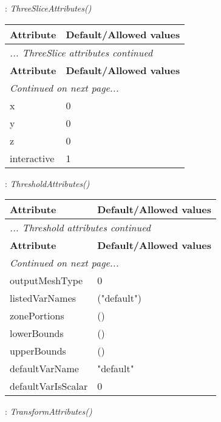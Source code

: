 \documentclass[10pt,a4paper]{report}
\begin{document}
\newpage

{}
: {\it ThreeSliceAttributes() }\\[-3mm]

\begin{longtable}{ll}
{\bf Attribute} & {\bf Default/Allowed values} \\
\hline \hline
\endfirsthead
\multicolumn{2}{l}{{\it ... ThreeSlice attributes continued}} \\
{\bf Attribute} & {\bf Default/Allowed values} \\
\hline \hline
\endhead
\hline
\multicolumn{2}{l}{{\it Continued on next page...}} \\
\endfoot
\hline
\endlastfoot

x  &  0 \\
y  &  0 \\
z  &  0 \\
interactive  &  1 \\
\end{longtable}

\newpage

{}
: {\it ThresholdAttributes() }\\[-3mm]

\begin{longtable}{ll}
{\bf Attribute} & {\bf Default/Allowed values} \\
\hline \hline
\endfirsthead
\multicolumn{2}{l}{{\it ... Threshold attributes continued}} \\
{\bf Attribute} & {\bf Default/Allowed values} \\
\hline \hline
\endhead
\hline
\multicolumn{2}{l}{{\it Continued on next page...}} \\
\endfoot
\hline
\endlastfoot

outputMeshType  &  0 \\
listedVarNames  &  ("default") \\
zonePortions  &  () \\
lowerBounds  &  () \\
upperBounds  &  () \\
defaultVarName  &  "default" \\
defaultVarIsScalar  &  0 \\
\end{longtable}

\newpage

{}
: {\it TransformAttributes() }\\[-3mm]
\end{document}
